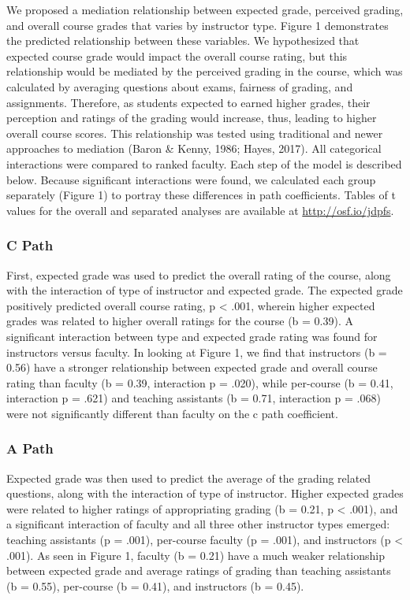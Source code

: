 \documentclass[man]{apa6}
\theoremstyle{definition}
\theoremstyle{definition}
\theoremstyle{definition}
\theoremstyle{remark}
\begin{document}
We proposed a mediation relationship between expected grade, perceived
grading, and overall course grades that varies by instructor type.
Figure 1 demonstrates the predicted relationship between these
variables. We hypothesized that expected course grade would impact the
overall course rating, but this relationship would be mediated by the
perceived grading in the course, which was calculated by averaging
questions about exams, fairness of grading, and assignments. Therefore,
as students expected to earned higher grades, their perception and
ratings of the grading would increase, thus, leading to higher overall
course scores. This relationship was tested using traditional and newer
approaches to mediation (Baron \& Kenny, 1986; Hayes, 2017). All
categorical interactions were compared to ranked faculty. Each step of
the model is described below. Because significant interactions were
found, we calculated each group separately (Figure 1) to portray these
differences in path coefficients. Tables of t values for the overall and
separated analyses are available at \url{http://osf.io/jdpfs}.

\subsubsection{C Path}\label{c-path}

First, expected grade was used to predict the overall rating of the
course, along with the interaction of type of instructor and expected
grade. The expected grade positively predicted overall course rating, p
\textless{} .001, wherein higher expected grades was related to higher
overall ratings for the course (b = 0.39). A significant interaction
between type and expected grade rating was found for instructors versus
faculty. In looking at Figure 1, we find that instructors (b = 0.56)
have a stronger relationship between expected grade and overall course
rating than faculty (b = 0.39, interaction p = .020), while per-course
(b = 0.41, interaction p = .621) and teaching assistants (b = 0.71,
interaction p = .068) were not significantly different than faculty on
the c path coefficient.

\subsubsection{A Path}\label{a-path}

Expected grade was then used to predict the average of the grading
related questions, along with the interaction of type of instructor.
Higher expected grades were related to higher ratings of appropriating
grading (b = 0.21, p \textless{} .001), and a significant interaction of
faculty and all three other instructor types emerged: teaching
assistants (p = .001), per-course faculty (p = .001), and instructors (p
\textless{} .001). As seen in Figure 1, faculty (b = 0.21) have a much
weaker relationship between expected grade and average ratings of
grading than teaching assistants (b = 0.55), per-course (b = 0.41), and
instructors (b = 0.45).
\end{document}
